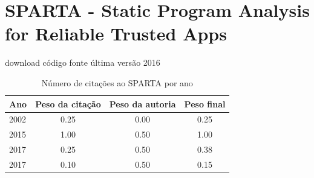 \section{SPARTA - Static Program Analysis for Reliable Trusted Apps}
\checkmark download
\checkmark código fonte
\checkmark última versão 2016
\begin{table}[H]
\caption{Número de citações ao SPARTA  por ano}
\centering
\begin{tabular}{| l | c | c | c |}
  \hline
  Ano & Peso da citação & Peso da autoria & Peso final \\
  \hline
  2002
    & 0.25
    & 0.00
    & {\color{red} 0.25} \\
\hline
  2015
    & 1.00
    & 0.50
    & {\color{blue} 1.00} \\
\hline
  2017
    & 0.25
    & 0.50
    & {\color{red} 0.38} \\
  2017
    & 0.10
    & 0.50
    & {\color{red} 0.15} \\
\hline
\end{tabular}
\end{table}
